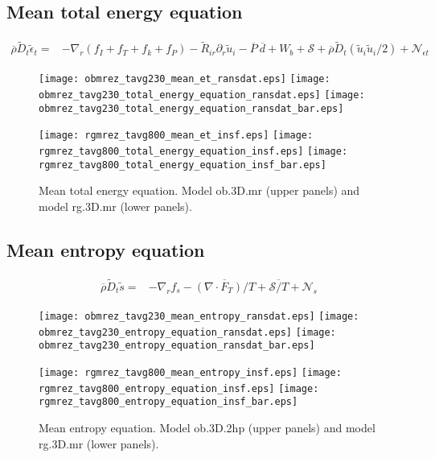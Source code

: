 \documentclass[10pt,paper=a4]{report}
\newcommand{\fht}{\widetilde}
\newcommand{\fav}{\widetilde}
\newcommand{\av}{\overline}
\begin{document}
\newpage

\subsection{Mean total energy equation}

\begin{align}
\av{\rho} \fav{D}_t \fav{\epsilon}_t = &  - \nabla_r ( f_I + f_T + f_k + f_P ) - \fht{R}_{ir}\partial_r \fht{u}_i - \av{P} \ \av{d} + W_b + {\mathcal S} + \av{\rho}\fav{D}_t (\fav{u}_i \fav{u}_i / 2) + {\mathcal N_{\epsilon t}} \label{eq:rans_etot}
\end{align}

\begin{figure}[!h]
\centerline{
\texttt{[image: obmrez\_tavg230\_mean\_et\_ransdat.eps]}
\texttt{[image: obmrez\_tavg230\_total\_energy\_equation\_ransdat.eps]}
\texttt{[image: obmrez\_tavg230\_total\_energy\_equation\_ransdat\_bar.eps]}}

\centerline{
\texttt{[image: rgmrez\_tavg800\_mean\_et\_insf.eps]}                      
\texttt{[image: rgmrez\_tavg800\_total\_energy\_equation\_insf.eps]}     
\texttt{[image: rgmrez\_tavg800\_total\_energy\_equation\_insf\_bar.eps]}}
\caption{Mean total energy equation. Model {\sf ob.3D.mr} (upper panels) and model {\sf rg.3D.mr} (lower panels). \label{fig:et-equation}}
\end{figure}

\newpage

\subsection{Mean entropy equation}

\begin{align}
\av{\rho} \fav{D}_t \fav{s} = & - \nabla_r  f_s    - \av{(\nabla \cdot F_T)/T}+ \av{{\mathcal S}/T} + {\mathcal N_s}  \label{eq:rans_entropy} 
\end{align}


\begin{figure}[!h]
\centerline{
\texttt{[image: obmrez\_tavg230\_mean\_entropy\_ransdat.eps]}
\texttt{[image: obmrez\_tavg230\_entropy\_equation\_ransdat.eps]}
\texttt{[image: obmrez\_tavg230\_entropy\_equation\_ransdat\_bar.eps]}}

\centerline{
\texttt{[image: rgmrez\_tavg800\_mean\_entropy\_insf.eps]}                      
\texttt{[image: rgmrez\_tavg800\_entropy\_equation\_insf.eps]}     
\texttt{[image: rgmrez\_tavg800\_entropy\_equation\_insf\_bar.eps]}}
\caption{Mean entropy equation. Model {\sf ob.3D.2hp} (upper panels) and model {\sf rg.3D.mr} (lower panels). \label{fig:ss-equation}}
\end{figure}
\end{document}

